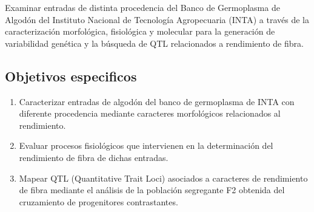 \documentclass[12pt,oneside]{reedthesis}
\providecommand{\tightlist}{%
  \setlength{\itemsep}{0pt}\setlength{\parskip}{0pt}}
\begin{document}
Examinar entradas de distinta procedencia del Banco de Germoplasma de Algodón del Instituto Nacional de Tecnología Agropecuaria (INTA) a través de la caracterización morfológica, fisiológica y molecular para la generación de variabilidad genética y la búsqueda de QTL relacionados a rendimiento de fibra.

\subsection{Objetivos especificos}\label{objetivos-especificos}

\begin{enumerate}
\def\labelenumi{\arabic{enumi})}
\tightlist
\item
  Caracterizar entradas de algodón del banco de germoplasma de INTA con diferente procedencia mediante caracteres morfológicos relacionados al rendimiento.
\item
  Evaluar procesos fisiológicos que intervienen en la determinación del rendimiento de fibra de dichas entradas.
\item
  Mapear QTL (Quantitative Trait Loci) asociados a caracteres de rendimiento de fibra mediante el análisis de la población segregante F2 obtenida del cruzamiento de progenitores contrastantes.
\end{enumerate}

\renewcommand{\thesection}{\thechapter.\arabic{section}} \renewcommand{\thesubsection}{\thesection.\arabic{subsection}}
\end{document}
